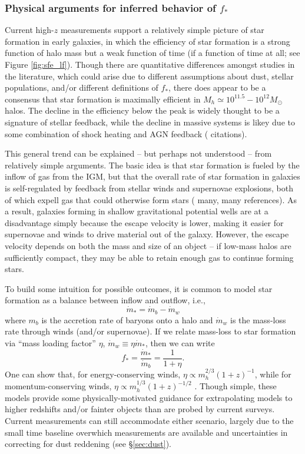 \subsubsection{Physical arguments for inferred behavior of $f_{\ast}$} \label{sec:sfe_physical}
Current high-$z$ measurements support a relatively simple picture of star formation in early galaxies, in which the efficiency of star formation is a strong function of halo mass but a weak function of time (if a function of time at all; see Figure \ref{fig:sfe_lf}). Though there are quantitative differences amongst studies in the literature, which could arise due to different assumptions about dust, stellar populations, and/or different definitions of $f_{\ast}$, there does appear to be a consensus that star formation is maximally efficient in $M_h \simeq 10^{11.5}-10^{12} M_{\odot}$ halos. The decline in the efficiency below the peak is widely thought to be a signature of stellar feedback, while the decline in massive systems is likey due to some combination of shock heating and AGN feedback ({\color{red} citations}). 

This general trend can be explained -- but perhaps not understood -- from relatively simple arguments. The basic idea is that star formation is fueled by the inflow of gas from the IGM, but that the overall rate of star formation in galaxies is self-regulated by feedback from stellar winds and supernovae explosions, both of which expell gas that could otherwise form stars ({\color{red} many, many references}). As a result, galaxies forming in shallow gravitational potential wells are at a disadvantage simply because the escape velocity is lower, making it easier for supernovae and winds to drive material out of the galaxy. However, the escape velocity depends on both the mass and size of an object -- if low-mass halos are sufficiently compact, they may be able to retain enough gas to continue forming stars.

To build some intuition for possible outcomes, it is common to model star formation as a balance between inflow and outflow, i.e.,
\begin{equation}
	\dot{m}_{\ast} = \dot{m}_b - \dot{m}_w
\end{equation}
where $m_b$ is the accretion rate of baryons onto a halo and $\dot{m}_w$ is the mass-loss rate through winds (and/or supernovae). If we relate mass-loss to star formation via ``mass loading factor'' $\eta$, $\dot{m}_w \equiv \eta \dot{m}_{\ast}$, then we can write
\begin{equation}
	f_{\ast} = \frac{\dot{m}_{\ast}}{\dot{m}_b} = \frac{1}{1 + \eta} .
\end{equation}
One can show that, for energy-conserving winds, $\eta \propto m_h^{2/3} (1+z)^{-1}$, while for momentum-conserving winds, $\eta \propto m_h^{1/3} (1+z)^{-1/2}$ \cite{Dayal2014,Furlanetto2017}. Though simple, these models provide some physically-motivated guidance for extrapolating models to higher redshifts and/or fainter objects than are probed by current surveys. Current measurements can still accommodate either scenario, largely due to the small time baseline overwhich measurements are available and uncertainties in correcting for dust reddening (see \S\ref{sec:dust}).

